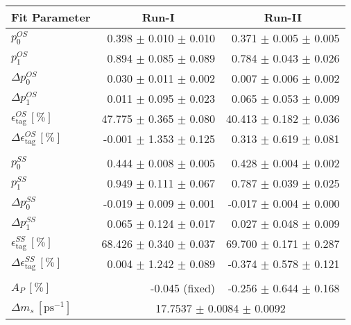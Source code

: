 \begin{tabular}{l r r } 
\hline
\hline
\multicolumn{1}{c}{Fit Parameter} & \multicolumn{1}{c}{Run-I} & \multicolumn{1}{c}{Run-II}  \\ 
\hline
$p_{0}^{OS}$ & 0.398 $\pm$ 0.010 $\pm$ 0.010 & 0.371 $\pm$ 0.005 $\pm$ 0.005 \\ 
$p_{1}^{OS}$ & 0.894 $\pm$ 0.085 $\pm$ 0.089 & 0.784 $\pm$ 0.043 $\pm$ 0.026 \\ 
$\Delta p_{0}^{OS}$ & 0.030 $\pm$ 0.011 $\pm$ 0.002 & 0.007 $\pm$ 0.006 $\pm$ 0.002 \\ 
$\Delta p_{1}^{OS}$ & 0.011 $\pm$ 0.095 $\pm$ 0.023 & 0.065 $\pm$ 0.053 $\pm$ 0.009 \\ 
$\epsilon_{\text{tag}}^{OS} \, [\%]$ & 47.775 $\pm$ 0.365 $\pm$ 0.080 & 40.413 $\pm$ 0.182 $\pm$ 0.036 \\ 
$\Delta \epsilon_{\text{tag}}^{OS} \, [\%]$ & -0.001 $\pm$ 1.353 $\pm$ 0.125 & 0.313 $\pm$ 0.619 $\pm$ 0.081 \\ 
 \\ 
$p_{0}^{SS}$ & 0.444 $\pm$ 0.008 $\pm$ 0.005 & 0.428 $\pm$ 0.004 $\pm$ 0.002 \\ 
$p_{1}^{SS}$ & 0.949 $\pm$ 0.111 $\pm$ 0.067 & 0.787 $\pm$ 0.039 $\pm$ 0.025 \\ 
$\Delta p_{0}^{SS}$ & -0.019 $\pm$ 0.009 $\pm$ 0.001 & -0.017 $\pm$ 0.004 $\pm$ 0.000 \\ 
$\Delta p_{1}^{SS}$ & 0.065 $\pm$ 0.124 $\pm$ 0.017 & 0.027 $\pm$ 0.048 $\pm$ 0.009 \\ 
$\epsilon_{\text{tag}}^{SS} \, [\%]$ & 68.426 $\pm$ 0.340 $\pm$ 0.037 & 69.700 $\pm$ 0.171 $\pm$ 0.287 \\ 
$\Delta \epsilon_{\text{tag}}^{SS} \, [\%]$ & 0.004 $\pm$ 1.242 $\pm$ 0.089 & -0.374 $\pm$ 0.578 $\pm$ 0.121 \\ 
 \\ 
$A_{P} \, [\%]$ & -0.045 (fixed) & -0.256 $\pm$ 0.644 $\pm$ 0.168 \\ 
\hline
$\Delta m_{s} \, [\text{ps}^{-1}]$ & \multicolumn{2}{c}{ 17.7537 $\pm$ 0.0084 $\pm$ 0.0092 }  \\ 
\hline
\hline
\end{tabular}
